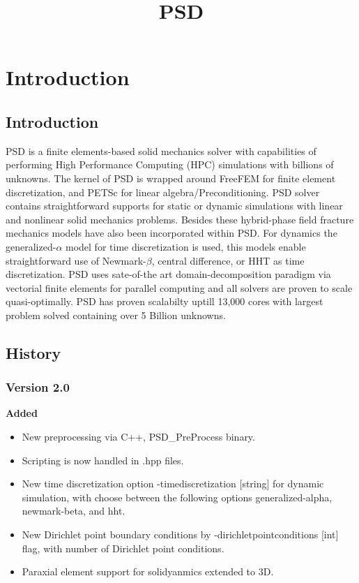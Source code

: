\documentclass{report}
\title{PSD}
\author{}
\begin{document}
\maketitle

\pagebreak
\tableofcontents
\pagebreak
\chapter{Introduction} 

\section{Introduction} 
PSD is a finite elements-based solid mechanics solver with capabilities of performing High Performance Computing (HPC) simulations with billions of unknowns. The kernel of PSD is wrapped around FreeFEM for finite element discretization, and PETSc for linear algebra/Preconditioning. PSD solver contains straightforward supports for static or dynamic simulations with linear  and nonlinear solid mechanics problems. Besides these hybrid-phase field fracture mechanics models have also been incorporated within PSD. For dynamics the generalized-$\alpha$ model  for time discretization is used, this models enable straightforward use of Newmark-$\beta$, central difference, or HHT as time discretization. PSD uses sate-of-the art domain-decomposition paradigm via vectorial finite elements for parallel computing and all solvers are  proven to scale quasi-optimally. PSD has proven scalabilty uptill 13,000 cores with largest problem solved containing over 5 Billion unknowns.

\section{History}
\subsection{Version 2.0}
\textbf{Added}
\begin{itemize}
    \item New preprocessing via C++, PSD\_PreProcess binary.
    \item Scripting is now handled in {\ttfamily .hpp} files.
    \item New time discretization option {\ttfamily -timediscretization [string]} for dynamic simulation, with {\ttfamily [string]} choose between the following options {\ttfamily generalized-alpha}, {\ttfamily newmark-beta}, and {\ttfamily hht}.
    \item New Dirichlet point boundary conditions  by {\ttfamily -dirichletpointconditions [int]} flag, with {\ttfamily  [int]} number of Dirichlet point conditions.
    \item Paraxial element support for solidyanmics extended to 3D.
\end{itemize}
\end{document}
